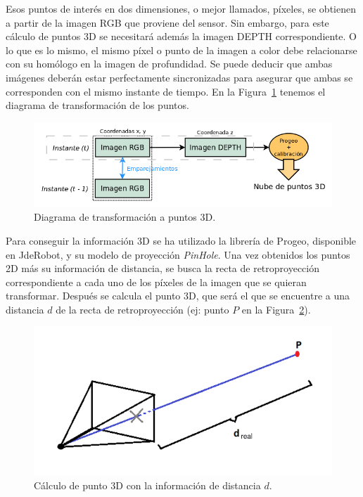 Esos puntos de interés en dos dimensiones, o mejor llamados, píxeles, se obtienen a partir de la imagen RGB que proviene del sensor. Sin embargo, para este cálculo de puntos 3D se necesitará además la imagen DEPTH correspondiente. O lo que es lo mismo, el mismo píxel o punto de la imagen a color debe relacionarse con su homólogo en la imagen de profundidad. Se puede deducir que ambas imágenes deberán estar perfectamente sincronizadas para asegurar que ambas se corresponden con el mismo instante de tiempo. En la Figura~\ref{fig:diagramPoints3d} tenemos el diagrama de transformación de los puntos.

\begin{figure}[th]
\centering
\includegraphics[scale=0.4]{Figures/diagram-points-3d.png}
\decoRule
\caption[Diagrama con la obtención de puntos 3D]{Diagrama de transformación a puntos 3D.}
\label{fig:diagramPoints3d}
\end{figure}

Para conseguir la información 3D se ha utilizado la librería de Progeo, disponible en JdeRobot, y su modelo de proyección \textit{PinHole}. Una vez obtenidos los puntos 2D más su información de distancia, se busca la recta de retroproyección correspondiente a cada uno de los píxeles de la imagen que se quieran transformar. Después se calcula el punto 3D, que será el que se encuentre a una distancia $d$ de la recta de retroproyección (ej: punto $P$ en la Figura~\ref{fig:camLine}).

\begin{figure}[th]
\centering
\includegraphics[scale=0.35]{Figures/cam-line.png}
\decoRule
\caption[Cálculo de punto 3D con la información de distancia $d$]{Cálculo de punto 3D con la información de distancia $d$.}
\label{fig:camLine}
\end{figure}

